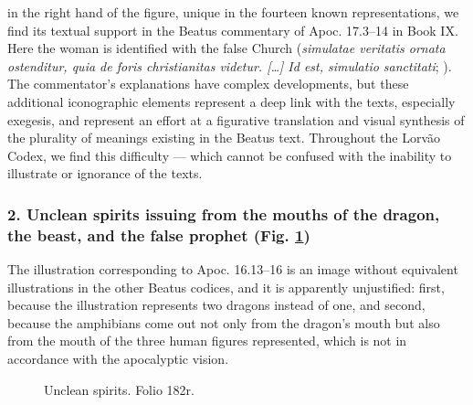 \begin{paper}
in the right hand of the figure, unique in the fourteen known
representations, we find its textual support in the Beatus commentary of
Apoc. 17.3--14 in Book IX. Here the woman is identified with the false
Church (\emph{simulatae veritatis ornata ostenditur, quia de foris
christianitas videtur. [\ldots] Id est, simulatio sanctitati}; \citealt[566]{gonzalez_echegaray_obras_1995}). The commentator's explanations
have complex developments, but these additional iconographic elements
represent a deep link with the texts, especially exegesis, and represent
an effort at a figurative translation and visual synthesis of the
plurality of meanings existing in the Beatus text. Throughout the Lorvão
Codex, we find this difficulty –– which cannot be confused with the
inability to illustrate or ignorance of the texts.

\subsubsection{2. Unclean spirits issuing from the mouths of the dragon, the
beast, and the false prophet (Fig. \ref{fig:rocha:spirits})} The illustration corresponding
to Apoc. 16.13--16 is an image without equivalent illustrations in the
other Beatus codices, and it is apparently unjustified: first, because
the illustration represents two dragons instead of one, and second,
because the amphibians come out not only from the dragon's mouth but
also from the mouth of the three human figures represented, which is not
in accordance with the apocalyptic vision.

\begin{figure}[H]
    \centering
    \caption{Unclean spirits. Folio 182r.}
    \label{fig:rocha:spirits}
\end{figure}


\end{paper}
